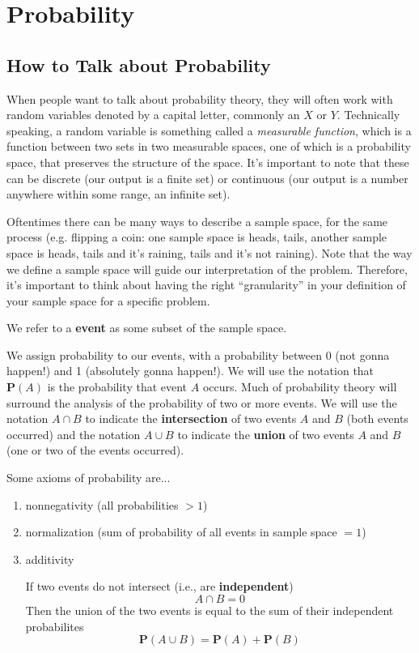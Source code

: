 \documentclass{article}
\begin{document}
\section{Probability}

\subsection{How to Talk about Probability}
When people want to talk about probability theory, they will often work with random variables denoted by a capital letter, commonly an $X$ or $Y$. Technically speaking, a random variable is something called a \textit{measurable function}, which is a function between two sets in two measurable spaces, one of which is a probability space, that preserves the structure of the space. It's important to note that these can be discrete (our output is a finite set) or continuous (our output is a number anywhere within some range, an infinite set).

Oftentimes there can be many ways to describe a sample space, for the same process (e.g. flipping a coin: one sample space is {heads, tails}, another sample space is {heads, tails and it's raining, tails and it's not raining}). Note that the way we define a sample space will guide our interpretation of the problem. Therefore, it's important to think about having the right ``granularity'' in your definition of your sample space for a specific problem. 

We refer to a \textbf{event} as some subset of the sample space.

We assign probability to our events, with a probability between 0 (not gonna happen!) and 1 (absolutely gonna happen!). We will use the notation that $\mathbf{P}(A)$ is the probability that event $A$ occurs. Much of probability theory will surround the analysis of the probability of two or more events. We will use the notation $A \cap B$ to indicate the \textbf{intersection} of two events $A$ and $B$ (both events occurred) and the notation $A \cup B$ to indicate the \textbf{union} of two events $A$ and $B$ (one or two of the events occurred). 

Some axioms of probability are...
\begin{enumerate}
\item\label{item:2} nonnegativity (all probabilities $> 1$) 
\item normalization (sum of probability of all events in sample space $= 1$)
\item additivity
  
If two events do not intersect (i.e., are \textbf{independent})
\begin{equation}
\label{eq:3}
A \cap B = 0 %
\end{equation}
Then the union of the two events is equal to the sum of their independent probabilites
\begin{equation}
\label{eq:2}
\mathbf{P}(A \cup B) = \mathbf{P}(A) + \mathbf{P}(B) %
\end{equation}
\end{enumerate}
\end{document}
